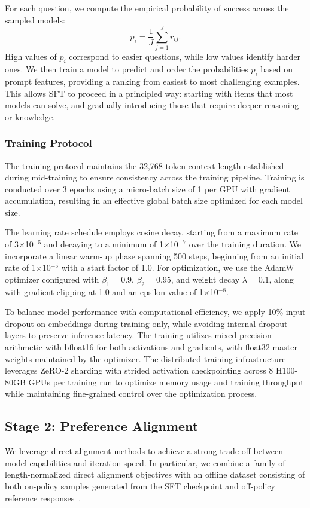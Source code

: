 \documentclass{article}
\begin{document}
For each question, we compute the empirical probability of success across the sampled models:
$$
p_i = \frac{1}{J} \sum_{j=1}^J r_{ij}.
$$
High values of $p_i$ correspond to easier questions, while low values identify harder ones. We then train a model to predict and order the probabilities $p_i$ based on prompt features, providing a ranking from easiest to most challenging examples. This allows SFT to proceed in a principled way: starting with items that most models can solve, and gradually introducing those that require deeper reasoning or knowledge.

\subsubsection{Training Protocol}

The training protocol maintains the 32,768 token context length established during mid-training to ensure consistency across the training pipeline. Training is conducted over 3 epochs using a micro-batch size of 1 per GPU with gradient accumulation, resulting in an effective global batch size optimized for each model size.

The learning rate schedule employs cosine decay, starting from a maximum rate of 3×10$^{-5}$ and decaying to a minimum of 1×10$^{-7}$ over the training duration. We incorporate a linear warm-up phase spanning 500 steps, beginning from an initial rate of 1×10$^{-5}$ with a start factor of 1.0. For optimization, we use the AdamW optimizer configured with $\beta_1 = 0.9$, $\beta_2 = 0.95$, and weight decay $\lambda = 0.1$, along with gradient clipping at 1.0 and an epsilon value of 1×10$^{-8}$.

To balance model performance with computational efficiency, we apply 10\% input dropout on embeddings during training only, while avoiding internal dropout layers to preserve inference latency. The training utilizes mixed precision arithmetic with bfloat16 for both activations and gradients, with float32 master weights maintained by the optimizer. The distributed training infrastructure leverages ZeRO-2 sharding with strided activation checkpointing across 8 H100-80GB GPUs per training run to optimize memory usage and training throughput while maintaining fine-grained control over the optimization process.

\subsection{Stage 2: Preference Alignment}
\label{sec:preference_alignment}
We leverage direct alignment methods to achieve a strong trade-off between model capabilities and iteration speed. In particular, we combine a family of length-normalized direct alignment objectives with an offline dataset consisting of both on-policy samples generated from the SFT checkpoint and off-policy reference responses~\citep{rafailov2023direct,meng2024simpo,lambert2024tulu,lisimplemix}.
\end{document}

